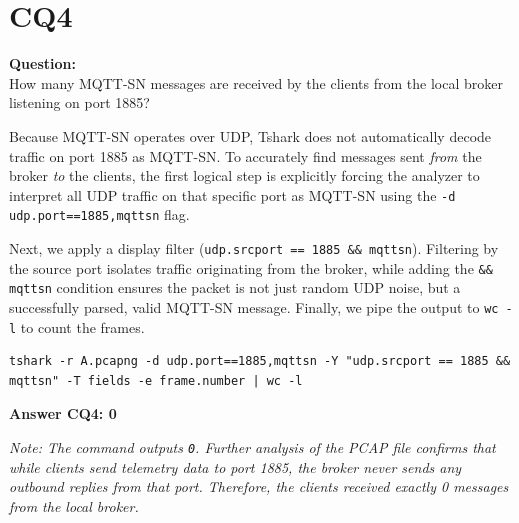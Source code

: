 \section{CQ4}

\begin{fancyquote}
    \textbf{Question:}\\
    How many MQTT-SN messages are received by the clients from the local broker listening on port 1885?
\end{fancyquote}

\vspace{0.3cm}

\noindent
\begin{minipage}{\linewidth}
Because MQTT-SN operates over UDP, Tshark does not automatically decode traffic on port 1885 as MQTT-SN. To accurately find messages sent \textit{from} the broker \textit{to} the clients, the first logical step is explicitly forcing the analyzer to interpret all UDP traffic on that specific port as MQTT-SN using the \texttt{-d udp.port==1885,mqttsn} flag. 

Next, we apply a display filter (\texttt{udp.srcport == 1885 \&\& mqttsn}). Filtering by the source port isolates traffic originating from the broker, while adding the \texttt{\&\& mqttsn} condition ensures the packet is not just random UDP noise, but a successfully parsed, valid MQTT-SN message. Finally, we pipe the output to \texttt{wc -l} to count the frames.

\begin{lstlisting}
tshark -r A.pcapng -d udp.port==1885,mqttsn -Y "udp.srcport == 1885 && mqttsn" -T fields -e frame.number | wc -l
\end{lstlisting}

\vspace{0.3cm}

\textbf{\huge Answer CQ4: 0}

\vspace{0.2cm}
\textit{Note: The command outputs \texttt{0}. Further analysis of the PCAP file confirms that while clients send telemetry data to port 1885, the broker never sends any outbound replies from that port. Therefore, the clients received exactly 0 messages from the local broker.}
\end{minipage}